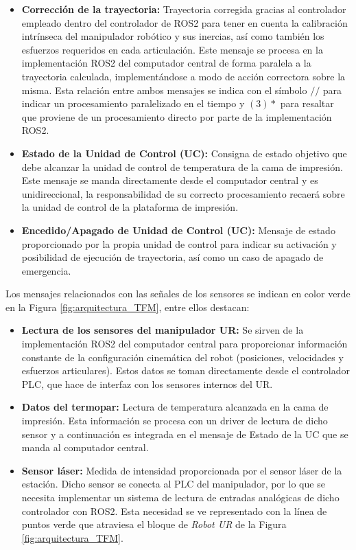 \begin{itemize}
    \item \textbf{Corrección de la trayectoria:} Trayectoria corregida gracias al controlador empleado dentro del controlador de ROS2 para tener en cuenta la calibración intrínseca del manipulador robótico y sus inercias, así como también los esfuerzos requeridos en cada articulación. Este mensaje se procesa en la implementación ROS2 del computador central de forma paralela a la trayectoria calculada, implementándose a modo de acción correctora sobre la misma. Esta relación entre ambos mensajes se indica con el símbolo $//$ para indicar un procesamiento paralelizado en el tiempo y $(3)*$ para resaltar que proviene de un procesamiento directo por parte de la implementación ROS2.

    \item \textbf{Estado de la Unidad de Control (UC):} Consigna de estado objetivo que debe alcanzar la unidad de control de temperatura de la cama de impresión. Este mensaje se manda directamente desde el computador central y es unidireccional, la responsabilidad de su correcto procesamiento recaerá sobre la unidad de control de la plataforma de impresión.

    \item \textbf{Encedido/Apagado de Unidad de Control (UC):} Mensaje de estado proporcionado por la propia unidad de control para indicar su activación y posibilidad de ejecución de trayectoria, así como un caso de apagado de emergencia.
\end{itemize}

Los mensajes relacionados con las señales de los sensores se indican en color verde en la Figura \ref{fig:arquitectura_TFM}, entre ellos destacan:
\begin{itemize}
    \item \textbf{Lectura de los sensores del manipulador UR:} Se sirven de la implementación ROS2 del computador central para proporcionar información constante de la configuración cinemática del robot (posiciones, velocidades y esfuerzos articulares). Estos datos se toman directamente desde el controlador \acrshort{PLC}, que hace de interfaz con los sensores internos del UR.

    \item \textbf{Datos del termopar:} Lectura de temperatura alcanzada en la cama de impresión. Esta información se procesa con un driver de lectura de dicho sensor y a continuación es integrada en el mensaje de Estado de la UC que se manda al computador central.

    \item \textbf{Sensor láser:} Medida de intensidad proporcionada por el sensor láser de la estación. Dicho sensor se conecta al \acrshort{PLC} del manipulador, por lo que se necesita implementar un sistema de lectura de entradas analógicas de dicho controlador con ROS2. Esta necesidad se ve representado con la línea de puntos verde que atraviesa el bloque de \textit{Robot UR} de la Figura \ref{fig:arquitectura_TFM}.
\end{itemize}

